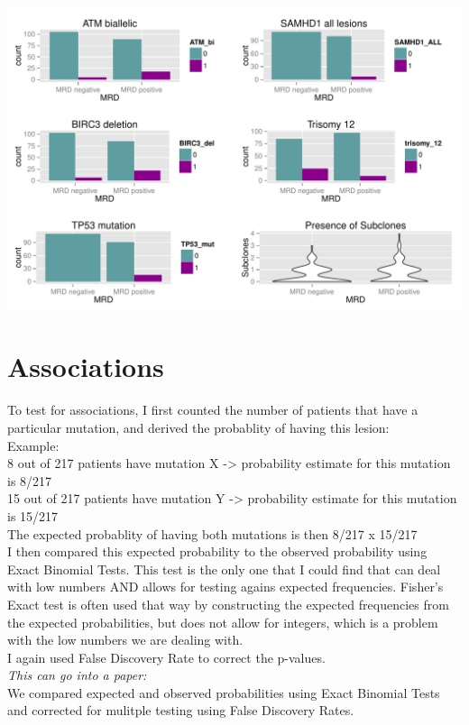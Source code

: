 \documentclass[a4paper,11pt]{article}
\begin{document}
\includegraphics{HICF1_Finalreportv6-004}

\section{Associations}
To test for associations, I first counted the number of patients that have a particular mutation, and derived the probablity of having this lesion:\\
Example:\\
8 out of 217 patients have mutation X -> probability estimate for this mutation is 8/217\\
15 out of 217 patients have mutation Y ->  probability estimate for this mutation is 15/217\\
The expected probablity of having both mutations is then 8/217 x 15/217\\

I then compared this expected probability to the observed probability using Exact Binomial Tests. This test is the only one that I could find that can deal with low numbers AND allows for testing agains expected frequencies. Fisher's Exact test is often used that way by constructing the expected frequencies from the expected probabilities, but does not allow for integers, which is a problem with the low numbers we are dealing with.\\
I again used False Discovery Rate to correct the p-values.\\

\emph{This can go into a paper:}\\
We compared expected and observed probabilities using Exact Binomial Tests and corrected for mulitple testing using False Discovery Rates.
\end{document}
